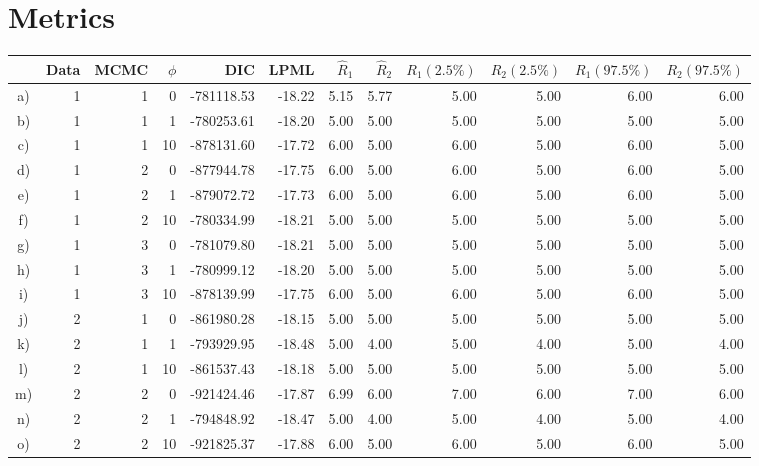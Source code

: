 \documentclass[10pt]{article} %
\begin{document}
\section{Metrics}
\begin{table}[H]
\centering
\begin{tabular}{crrrrrrrrrrr}
  \hline
  \rule{0pt}{2.6ex}
  & Data & MCMC & $\phi$ & DIC & LPML & $\hat{R}_1$ & $\hat{R}_2$& $R_1 (2.5\%)$ & $R_2 (2.5\%)$ & $R_1 (97.5\%)$ & $R_2 (97.5\%)$ \\
  \hline
  a) &1 &1 & 0 & -781118.53 & -18.22 & 5.15 & 5.77 & 5.00 & 5.00 & 6.00 & 6.00 \\
  b) &1 &1 & 1 & -780253.61 & -18.20 & 5.00 & 5.00 & 5.00 & 5.00 & 5.00 & 5.00 \\
  c) &1 &1 &10 & -878131.60 & -17.72 & 6.00 & 5.00 & 6.00 & 5.00 & 6.00 & 5.00 \\
  \hline                                           
  d) &1 &2 & 0 & -877944.78 & -17.75 & 6.00 & 5.00 & 6.00 & 5.00 & 6.00 & 5.00 \\
  e) &1 &2 & 1 & -879072.72 & -17.73 & 6.00 & 5.00 & 6.00 & 5.00 & 6.00 & 5.00 \\
  f) &1 &2 &10 & -780334.99 & -18.21 & 5.00 & 5.00 & 5.00 & 5.00 & 5.00 & 5.00 \\
  \hline                                           
  g) &1 &3 & 0 & -781079.80 & -18.21 & 5.00 & 5.00 & 5.00 & 5.00 & 5.00 & 5.00 \\
  h) &1 &3 & 1 & -780999.12 & -18.20 & 5.00 & 5.00 & 5.00 & 5.00 & 5.00 & 5.00 \\
  i) &1 &3 &10 & -878139.99 & -17.75 & 6.00 & 5.00 & 6.00 & 5.00 & 6.00 & 5.00 \\
  \hline\hline                                     
  j) &2 &1 & 0 & -861980.28 & -18.15 & 5.00 & 5.00 & 5.00 & 5.00 & 5.00 & 5.00 \\
  k) &2 &1 & 1 & -793929.95 & -18.48 & 5.00 & 4.00 & 5.00 & 4.00 & 5.00 & 4.00 \\
  l) &2 &1 &10 & -861537.43 & -18.18 & 5.00 & 5.00 & 5.00 & 5.00 & 5.00 & 5.00 \\
  \hline                                           
  m) &2 &2 & 0 & -921424.46 & -17.87 & 6.99 & 6.00 & 7.00 & 6.00 & 7.00 & 6.00 \\
  n) &2 &2 & 1 & -794848.92 & -18.47 & 5.00 & 4.00 & 5.00 & 4.00 & 5.00 & 4.00 \\
  o) &2 &2 &10 & -921825.37 & -17.88 & 6.00 & 5.00 & 6.00 & 5.00 & 6.00 & 5.00 \\

\end{tabular}
\end{table}
\end{document}
